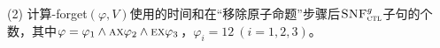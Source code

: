 \documentclass[9pt, CJK]{beamer}
\begin{document}
\begin{frame}
{			(2) 计算{\CTL-forget}$(\varphi, V)$使用的时间和在“移除原子命题”步骤后${\textsc{SNF}_{\textsc{ctl}}^g}$子句的个数，其中$\varphi=\varphi_1 \wedge \textsc{a}\textsc{x} \varphi_2 \wedge \textsc{e}\textsc{x} \varphi_3$，$\varphi_i=12~(i=1,2,3)$。
			
			\begin{figure}
				\centering
				\qquad
				\label{chapter04:fig:for12}
			\end{figure}
		}
	\end{frame}
	
\end{document}
